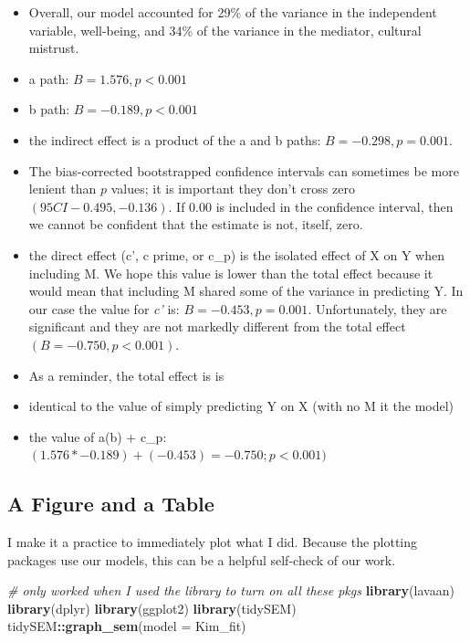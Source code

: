 \documentclass[
  11pt,
]{book}
\newenvironment{Shaded}{\begin{snugshade}}{\end{snugshade}}
\newcommand{\AttributeTok}[1]{\textcolor[rgb]{0.27,0.27,0.27}{#1}}
\newcommand{\CommentTok}[1]{\textcolor[rgb]{0.37,0.37,0.37}{\textit{#1}}}
\newcommand{\FunctionTok}[1]{\textcolor[rgb]{0.27,0.27,0.27}{\textbf{#1}}}
\newcommand{\NormalTok}[1]{#1}
\newcommand{\SpecialCharTok}[1]{\textcolor[rgb]{0.43,0.43,0.43}{\textbf{#1}}}
\providecommand{\tightlist}{%
  \setlength{\itemsep}{0pt}\setlength{\parskip}{0pt}}
\begin{document}
\begin{itemize}
\tightlist
\item
  Overall, our model accounted for 29\% of the variance in the independent variable, well-being, and 34\% of the variance in the mediator, cultural mistrust.
\item
  a path: \(B = 1.576, p < 0.001\)
\item
  b path: \(B = -0.189, p < 0.001\)
\item
  the indirect effect is a product of the a and b paths: \(B = -0.298, p = 0.001\).
\item
  The bias-corrected bootstrapped confidence intervals can sometimes be more lenient than \(p\) values; it is important they don't cross zero \((95CI -0.495, -0.136 )\). If 0.00 is included in the confidence interval, then we cannot be confident that the estimate is not, itself, zero.
\item
  the direct effect (c', c prime, or c\_p) is the isolated effect of X on Y when including M. We hope this value is lower than the total effect because it would mean that including M shared some of the variance in predicting Y. In our case the value for \emph{c'} is: \(B = -0.453, p = 0.001\). Unfortunately, they are significant and they are not markedly different from the total effect \((B = -0.750, p < 0.001)\).
\item
  As a reminder, the total effect is is
\item
  identical to the value of simply predicting Y on X (with no M it the model)
\item
  the value of a(b) + c\_p: \((1.576*-0.189) + (-0.453) = -0.750; p < 0.001)\)
\end{itemize}

\hypertarget{a-figure-and-a-table}{%
\subsection{A Figure and a Table}\label{a-figure-and-a-table}}

I make it a practice to immediately plot what I did. Because the plotting packages use our models, this can be a helpful self-check of our work.

\begin{Shaded}
\begin{Highlighting}[]
\CommentTok{\# only worked when I used the library to turn on all these pkgs}
\FunctionTok{library}\NormalTok{(lavaan)}
\FunctionTok{library}\NormalTok{(dplyr)}
\FunctionTok{library}\NormalTok{(ggplot2)}
\FunctionTok{library}\NormalTok{(tidySEM)}
\NormalTok{tidySEM}\SpecialCharTok{::}\FunctionTok{graph\_sem}\NormalTok{(}\AttributeTok{model =}\NormalTok{ Kim\_fit)}
\end{Highlighting}
\end{Shaded}
\end{document}
